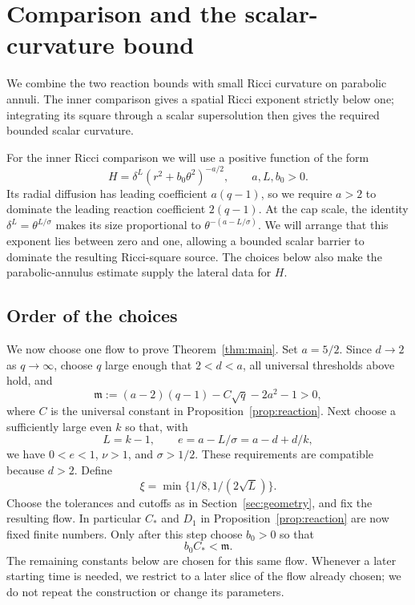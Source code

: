 \section{Comparison and the scalar-curvature bound}\label{sec:barriers}

We combine the two reaction bounds with small Ricci curvature on
parabolic annuli. The inner comparison gives a spatial Ricci exponent
strictly below one; integrating its square through a scalar supersolution
then gives the required bounded scalar curvature.

For the inner Ricci comparison we will use a positive function of the form
\[
H=\delta^L(r^2+b_0\theta^2)^{-a/2},
\qquad a,L,b_0>0.
\]
Its radial diffusion has leading coefficient \(a(q-1)\), so we require
\(a>2\) to dominate the leading reaction coefficient \(2(q-1)\).
At the cap scale, the identity \(\delta^L=\theta^{L/\sigma}\) makes
its size proportional to \(\theta^{-(a-L/\sigma)}\). We will arrange
that this exponent lies between zero and one, allowing a bounded scalar
barrier to dominate the resulting Ricci-square source. The choices below also make the
parabolic-annulus estimate supply the lateral data for \(H\).

\subsection{Order of the choices}

We now choose one flow to prove Theorem~\ref{thm:main}. Set \(a=5/2\).
Since \(d\to2\) as \(q\to\infty\), choose \(q\) large enough that
\(2<d<a\), all universal thresholds above hold, and
\begin{equation}\label{eq:dimension-margin}
\mathfrak m:=(a-2)(q-1)-C\sqrt q-2a^2-1>0,
\end{equation}
where \(C\) is the universal constant in Proposition~\ref{prop:reaction}.
Next choose a sufficiently large even \(k\) so that, with
\begin{equation}\label{eq:barrier-exponents}
L=k-1,\qquad e=a-L/\sigma=a-d+d/k,
\end{equation}
we have \(0<e<1\), \(\nu>1\), and \(\sigma>1/2\).
These requirements are compatible because \(d>2\).
Define
\[
\xi=\min\{1/8,1/(2\sqrt L)\}.
\]
Choose the tolerances and cutoffs as in Section~\ref{sec:geometry}, and
fix the resulting flow. In particular \(C_*\) and \(D_1\) in
Proposition~\ref{prop:reaction} are now fixed finite numbers.
Only after this step choose \(b_0>0\) so that
\begin{equation}\label{eq:b0-choice}
b_0C_*<\mathfrak m.
\end{equation}
The remaining constants below are chosen for this same flow. Whenever a
later starting time is needed, we restrict to a later slice of the flow
already chosen; we do not repeat the construction or change its parameters.

